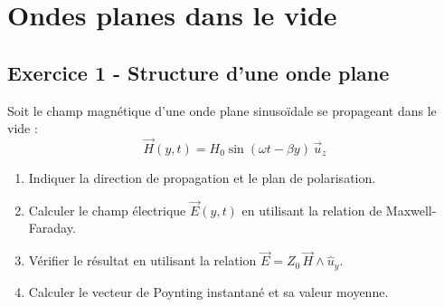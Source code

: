 \documentclass[12pt,a4paper]{article}
\begin{document}
\newpage
\section{Ondes planes dans le vide}

\subsection*{Exercice 1 - Structure d'une onde plane \niveau{\facile}}

\begin{boiteexercice}
Soit le champ magnétique d'une onde plane sinusoïdale se propageant dans le vide :
\[
\vec{H}(y,t) = H_0\sin(\omega t - \beta y)\,\vec{u}_z
\]
\begin{enumerate}
  \item Indiquer la direction de propagation et le plan de polarisation.
  \item Calculer le champ électrique $\vec{E}(y,t)$ en utilisant la relation de Maxwell-Faraday.
  \item Vérifier le résultat en utilisant la relation $\vec{E} = Z_0\,\vec{H}\wedge\hat{u}_y$.
  \item Calculer le vecteur de Poynting instantané et sa valeur moyenne.
\end{enumerate}
\end{boiteexercice}
\end{document}
